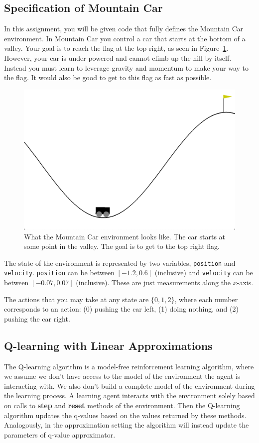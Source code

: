 \documentclass[11pt,addpoints,answers]{exam}
\begin{document}
\subsection{Specification of Mountain Car}
In this assignment, you will be given code that fully defines the Mountain Car environment. In Mountain Car you control a car that starts at the bottom of a valley. Your goal is to reach the flag at the top right, as seen in Figure~\ref{fig:mountaincar}. However, your car is under-powered and cannot climb up the hill by itself. Instead you must learn to leverage gravity and momentum to make your way to the flag. It would also be good to get to this flag as fast as possible.

\begin{figure}[H]
    \centering
    \includegraphics[width=0.5\linewidth]{MountainCar.png}
    \caption{What the Mountain Car environment looks like. The car starts at some point in the valley. The goal is to get to the top right flag.}
    \label{fig:mountaincar}
\end{figure}

The state of the environment is represented by two variables, \texttt{position} and \texttt{velocity}. \texttt{position} can be between $[-1.2, 0.6]$ (inclusive) and \texttt{velocity} can be between $[-0.07, 0.07]$ (inclusive). These are just measurements along the $x$-axis.

The actions that you may take at any state are $\{0, 1, 2\}$, where each number corresponds to an action: (0) pushing the car left, (1) doing nothing, and (2) pushing the car right.

\subsection{Q-learning with Linear Approximations}
The Q-learning algorithm is a model-free reinforcement learning algorithm, where we assume we don't have access to the model of the environment the agent is interacting with. We also don't build a complete model of the environment during the learning process. A learning agent interacts with the environment solely based on calls to \textbf{step} and \textbf{reset} methods of the environment. Then the Q-learning algorithm updates the q-values based on the values returned by these methods. Analogously, in the approximation setting the algorithm will instead update the parameters of q-value approximator.
\end{document}
